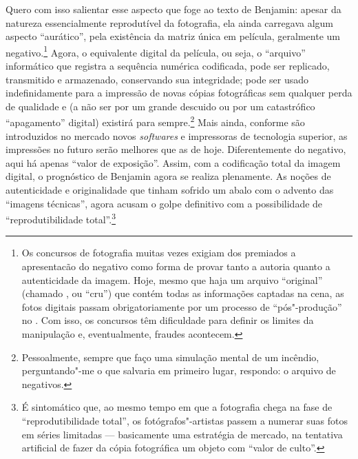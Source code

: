 Quero com isso salientar esse aspecto que foge ao texto de Benjamin:
apesar da natureza essencialmente reprodutível da fotografia, ela ainda
carregava algum aspecto ``aurático'', pela existência da matriz única em
película, geralmente um negativo.\footnote{Os concursos de fotografia
  muitas vezes exigiam dos premiados a apresentacão do negativo como
  forma de provar tanto a autoria quanto a autenticidade da imagem.
  Hoje, mesmo que haja um arquivo ``original'' (chamado {}, ou
  ``cru'') que contém todas as informações captadas na cena, as fotos
  digitais passam obrigatoriamente por um processo de ``pós"-produção''
  no {}. Com isso, os concursos têm dificuldade para
  definir os limites da manipulação e, eventualmente, fraudes acontecem.}
Agora, o equivalente digital da película, ou seja, o ``arquivo''
informático que registra a sequência numérica codificada, pode ser
replicado, transmitido e armazenado, conservando sua integridade; pode
ser usado indefinidamente para a impressão de novas cópias fotográficas
sem qualquer perda de qualidade e (a não ser por um grande descuido ou
por um catastrófico ``apagamento'' digital) existirá para sempre.\footnote{Pessoalmente,
  sempre que faço uma simulação mental de um incêndio, perguntando"-me o
  que salvaria em primeiro lugar, respondo: o arquivo de negativos.}
Mais ainda, conforme são introduzidos no mercado novos \emph{softwares}
e impressoras de tecnologia superior, as impressões no futuro serão
melhores que as de hoje. Diferentemente do negativo, aqui há apenas
``valor de exposição''. Assim, com a codificação total da imagem digital,
o prognóstico de Benjamin agora se realiza plenamente. As noções de
autenticidade e originalidade que tinham sofrido um abalo com o advento
das ``imagens técnicas'', agora acusam o golpe definitivo com a
possibilidade de ``reprodutibilidade total''.\footnote{É sintomático que,
  ao mesmo tempo em que a fotografia chega na fase de
  ``reprodutibilidade total'', os fotógrafos"-artistas passem a numerar
  suas fotos em séries limitadas --- basicamente uma estratégia de
  mercado, na tentativa artificial de fazer da cópia fotográfica um
  objeto com ``valor de culto''.}

